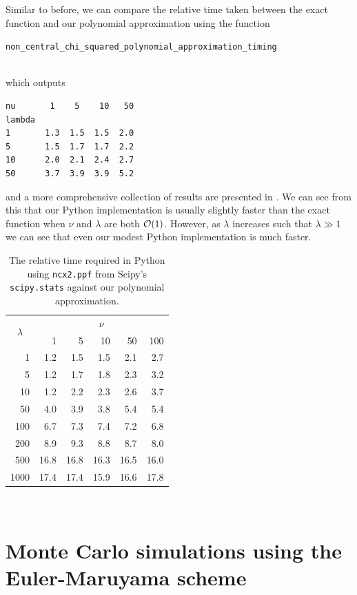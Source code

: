\documentclass[11pt,a4paper,twoside,english]{extarticle}
\newcommand{\singlecodeline}[1]{\\[1em]\centerline{\lstinline[basicstyle=\ttfamily]$#1$}\\[1em]}
\begin{document}
Similar to before, we can compare the relative time taken between the exact function and our polynomial approximation using the function \singlecodeline{non_central_chi_squared_polynomial_approximation_timing}
which outputs
\begin{verbatim}
nu       1    5    10   50
lambda                    
1       1.3  1.5  1.5  2.0
5       1.5  1.7  1.7  2.2
10      2.0  2.1  2.4  2.7
50      3.7  3.9  3.9  5.2
\end{verbatim}
and a more comprehensive collection of results are presented in . We can see from this that our Python implementation is usually slightly faster than the exact function when $ \nu $ and $ \lambda $ are both $ \order{1} $. However, as $ \lambda $ increases such that $ \lambda \gg 1 $ we can see that even our modest Python implementation is much faster. 

\begin{table}[htb]
\centering    
\begin{tabular}{|r|rrrrr|}
\multicolumn{1}{c}{\multirow{2}{*}{$ \lambda $}} & \multicolumn{5}{c}{$ \nu $} \\
\cline{2-6}
\multicolumn{1}{c|}{} & 1 &   5  &  10 &  50  & 100 \\
\hline
   1 &  1.2 &  1.5 &  1.5 &  2.1 &  2.7 \\
   5 &  1.2 &  1.7 &  1.8 &  2.3 &  3.2 \\
  10 &  1.2 &  2.2 &  2.3 &  2.6 &  3.7 \\
  50 &  4.0 &  3.9 &  3.8 &  5.4 &  5.4 \\
 100 &  6.7 &  7.3 &  7.4 &  7.2 &  6.8 \\
 200 &  8.9 &  9.3 &  8.8 &  8.7 &  8.0 \\
 500 & 16.8 & 16.8 & 16.3 & 16.5 & 16.0 \\
1000 & 17.4 & 17.4 & 15.9 & 16.6 & 17.8 \\
\hline 
\end{tabular}\\[1em]
\caption{The relative time required in Python using \texttt{ncx2.ppf} from Scipy's \texttt{scipy.stats} against our polynomial approximation.}
\label{tab:non_central_chi_2_times_python_approximation}
\end{table}





\clearpage
\section{Monte Carlo simulations using the Euler-Maruyama scheme}
\end{document}
